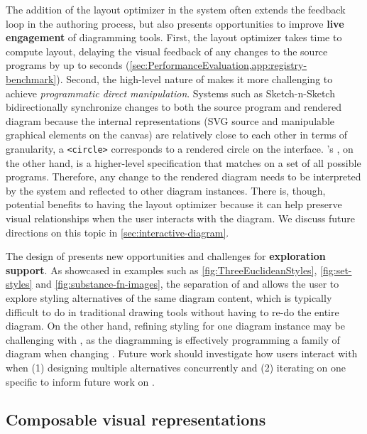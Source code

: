The addition of the layout optimizer in the \Penrose system often extends the feedback loop in the authoring process, but also presents opportunities to improve \textbf{live engagement} of diagramming tools. First, the layout optimizer takes time to compute layout, delaying the visual feedback of any changes to the \Penrose source programs by up to seconds (\cref{sec:PerformanceEvaluation,app:registry-benchmark}). Second, the high-level nature of \Style makes it more challenging to achieve \textit{programmatic direct manipulation}. Systems such as Sketch-n-Sketch~\cite{Sketch-n-Sketch} bidirectionally synchronize changes to both the source program and rendered diagram because the internal representations (SVG source and manipulable graphical elements on the canvas) are relatively close to each other in terms of granularity, \eg a \texttt{<circle>} corresponds to a rendered circle on the interface. \Penrose's \Style, on the other hand, is a higher-level specification that matches on a set of all possible \Substance programs. Therefore, any change to the rendered diagram needs to be interpreted by the system and reflected to other diagram instances. There is, though, potential benefits to having the layout optimizer because it can help preserve visual relationships when the user interacts with the diagram. We discuss future directions on this topic in \cref{sec:interactive-diagram}.

The design of \Style presents new opportunities and challenges for \textbf{exploration support}. As showcased in examples such as \cref{fig:ThreeEuclideanStyles}, \cref{fig:set-styles} and \cref{fig:substance-fn-images}, the separation of \Style and \Substance allows the user to explore styling alternatives of the same diagram content, which is typically difficult to do in traditional drawing tools without having to re-do the entire diagram. On the other hand, refining styling for one diagram instance may be challenging with \Style, as the diagramming is effectively programming a family of diagram when changing \Style. Future work should investigate how users interact with \Penrose when (1) designing multiple \Style alternatives concurrently and (2) iterating on one specific \Style to inform future work on \Style. 

\subsection{Composable visual representations}

